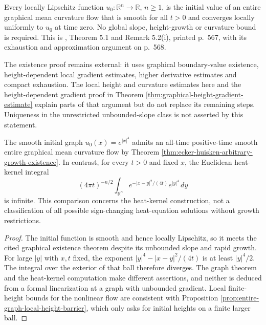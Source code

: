 \begin{theorem}\label{thm:ecker-huisken-arbitrary-growth-existence}
Every locally Lipschitz function $u_0:\mathbb R^n\to\mathbb R$, $n\geq1$, is the initial value of an entire graphical mean curvature flow that is smooth for all $t>0$ and converges locally uniformly to $u_0$ at time zero. No global slope, height-growth or curvature bound is required. This is \cite{EH91}, Theorem 5.1 and Remark 5.2(i), printed p.~567, with its exhaustion and approximation argument on p.~568.

The existence proof remains external: it uses graphical boundary-value existence, height-dependent local gradient estimates, higher derivative estimates and compact exhaustion. The local height and curvature estimates here and the height-dependent gradient proof in Theorem \ref{thm:graphical-height-gradient-estimate} explain parts of that argument but do not replace its remaining steps. Uniqueness in the unrestricted unbounded-slope class is not asserted by this statement.
\end{theorem}

\begin{example}\label{ex:graph-flow-superexponential-data}
The smooth initial graph $u_0(x)=e^{|x|^4}$ admits an all-time positive-time smooth entire graphical mean curvature flow by Theorem \ref{thm:ecker-huisken-arbitrary-growth-existence}. In contrast, for every $t>0$ and fixed $x$, the Euclidean heat-kernel integral
\[
 (4\pi t)^{-n/2}\int_{\mathbb R^n}e^{-|x-y|^2/(4t)}e^{|y|^4}\,dy
\]
is infinite. This comparison concerns the heat-kernel construction, not a classification of all possible sign-changing heat-equation solutions without growth restrictions.
\end{example}
\begin{proof}
The initial function is smooth and hence locally Lipschitz, so it meets the cited graphical existence theorem despite its unbounded slope and rapid growth. For large $|y|$ with $x,t$ fixed, the exponent $|y|^4-|x-y|^2/(4t)$ is at least $|y|^4/2$. The integral over the exterior of that ball therefore diverges. The graph theorem and the heat-kernel computation make different assertions, and neither is deduced from a formal linearization at a graph with unbounded gradient. Local finite-height bounds for the nonlinear flow are consistent with Proposition \ref{prop:entire-graph-local-height-barrier}, which only asks for initial heights on a finite larger ball.
\end{proof}
